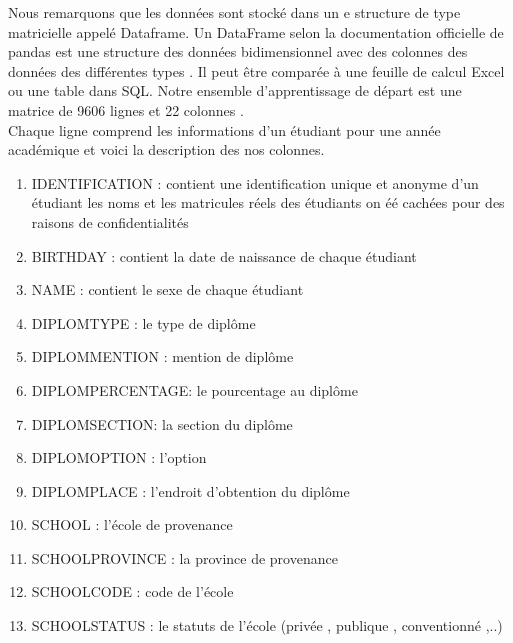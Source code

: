 Nous remarquons que les données sont stocké dans un e structure de type
matricielle appelé Dataframe. \cite{pedregosa2011scikit}
Un DataFrame selon la documentation officielle de pandas est une
structure des données bidimensionnel avec des colonnes des données des différentes types . Il peut être comparée à une feuille de calcul Excel ou une table dans \ac{SQL}.
Notre ensemble d'apprentissage de départ est une matrice de 9606 lignes et  22 colonnes .\\
Chaque ligne comprend les informations d'un étudiant pour une année académique et voici la description des nos colonnes.\\ 
\begin{multicols}{2}
	\begin{enumerate}
	 \item IDENTIFICATION : contient une identification unique et anonyme d'un étudiant les noms et les matricules réels des étudiants on éé cachées
	pour des raisons de confidentialités
	
	\item BIRTHDAY : contient la date de naissance de chaque étudiant
	
	\item NAME : contient le sexe de chaque étudiant
	

	
	\item DIPLOMTYPE : le type de diplôme
	
	\item DIPLOMMENTION : mention de diplôme
	
	\item  DIPLOMPERCENTAGE: le pourcentage au diplôme
	
	\item DIPLOMSECTION: la section du diplôme
	
	\item DIPLOMOPTION : l'option
	
	\item  DIPLOMPLACE : l'endroit d'obtention du diplôme
	
	\item SCHOOL : l'école de provenance
	
	\item  SCHOOLPROVINCE : la province de provenance
	
	\item  SCHOOLCODE : code de l'école
	
	\item SCHOOLSTATUS : le statuts de l'école (privée , publique ,
	conventionné ,..)
	

\end{enumerate}
\end{multicols}
